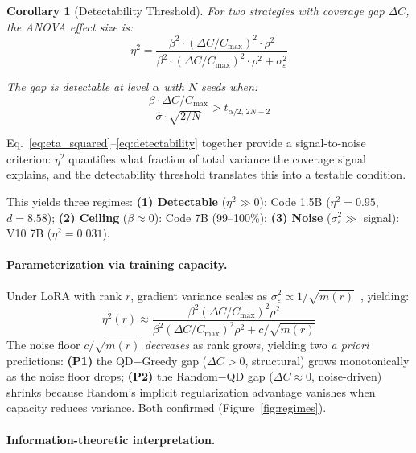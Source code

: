 \documentclass{article}
\theoremstyle{plain}
\newtheorem{corollary}{Corollary}
\theoremstyle{remark}
\begin{document}
\begin{corollary}[Detectability Threshold]
\label{cor:detect}
For two strategies with coverage gap $\Delta C$, the ANOVA effect size is:
\begin{equation}
\eta^2 = \frac{\beta^2 \cdot (\Delta C / C_{\max})^2 \cdot \rho^2}{\beta^2 \cdot (\Delta C / C_{\max})^2 \cdot \rho^2 + \sigma^2_\varepsilon}
\label{eq:eta_squared}
\end{equation}

The gap is detectable at level $\alpha$ with $N$ seeds when:
\begin{equation}
\frac{\beta \cdot \Delta C / C_{\max}}{\hat{\sigma} \cdot \sqrt{2/N}} > t_{\alpha/2,\, 2N-2}
\label{eq:detectability}
\end{equation}

\end{corollary}

Eq.~\ref{eq:eta_squared}--\ref{eq:detectability} together provide a signal-to-noise criterion: $\eta^2$ quantifies what fraction of total variance the coverage signal explains, and the detectability threshold translates this into a testable condition.

This yields three regimes:
\textbf{(1) Detectable} ($\eta^2 \gg 0$): Code 1.5B ($\eta^2{=}0.95$, $d{=}8.58$);
\textbf{(2) Ceiling} ($\beta \approx 0$): Code 7B (99--100\%);
\textbf{(3) Noise} ($\sigma^2_\varepsilon \gg$ signal): V10 7B ($\eta^2{=}0.031$).

\paragraph{Parameterization via training capacity.}
Under LoRA with rank $r$, gradient variance scales as $\sigma^2_\varepsilon \propto 1/\sqrt{m(r)}$~\citep{allen2019convergence}, yielding:
\begin{equation}
\eta^2(r) \approx \frac{\beta^2 (\Delta C / C_{\max})^2 \rho^2}{\beta^2 (\Delta C / C_{\max})^2 \rho^2 + c / \sqrt{m(r)}}
\label{eq:eta_rank}
\end{equation}
The noise floor $c/\sqrt{m(r)}$ \emph{decreases} as rank grows, yielding two \emph{a priori} predictions: \textbf{(P1)} the QD$-$Greedy gap ($\Delta C > 0$, structural) grows monotonically as the noise floor drops; \textbf{(P2)} the Random$-$QD gap ($\Delta C \approx 0$, noise-driven) shrinks because Random's implicit regularization advantage vanishes when capacity reduces variance.
Both confirmed (Figure~\ref{fig:regimes}).


\paragraph{Information-theoretic interpretation.}
\end{document}
